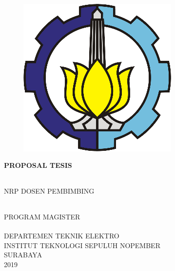 \begin{FontCover}
	\sffamily	
\thispagestyle{empty}
\begin{figure} [!t]
	\includegraphics[keepaspectratio=true,scale=1,left]{lib/LogoITS.png}
	\caption*{}
	\label{fig:LogoITS}
\end{figure}
\vspace{1ex}
\vspace{10ex}
\justify
\textbf{PROPOSAL TESIS}
\vspace{1ex}
\justify
\Large
\begin{spacing}{1}
\flushleft
\textbf{\JdTesis}
\end{spacing}
\normalsize
\vfill
\justify

\normalsize
\NamaMahasiswa\\
NRP \NrpMahasiswa
\vspace{2ex}
\justify
DOSEN PEMBIMBING\\
\PbSatu\\
 
\vfill
\justify
PROGRAM MAGISTER\\
\bdk\\
DEPARTEMEN TEKNIK ELEKTRO\\
INSTITUT TEKNOLOGI SEPULUH NOPEMBER\\
SURABAYA\\
2019
\vspace{1ex}
\normalfont
\end{FontCover}
\newpage